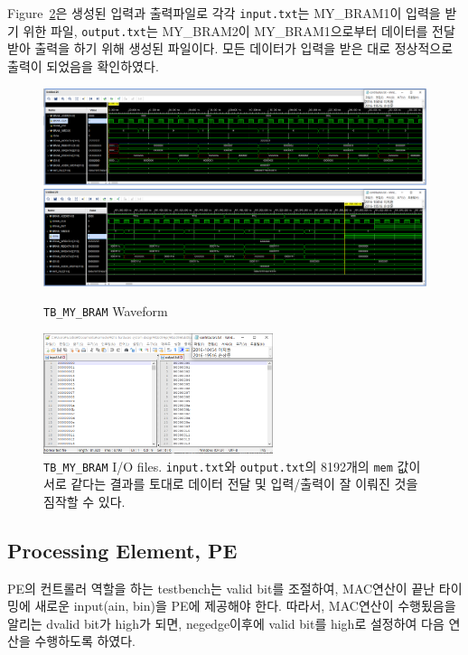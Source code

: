 \documentclass{article}
\begin{document}
Figure~\ref{fig3}은 생성된 입력과 출력파일로 각각 \texttt{input.txt}는 MY\_BRAM1이 입력을 받기 위한 파일, \texttt{output.txt}는 MY\_BRAM2이 MY\_BRAM1으로부터 데이터를 전달받아 출력을 하기 위해 생성된 파일이다. 모든 데이터가 입력을 받은 대로 정상적으로 출력이 되었음을 확인하였다.
\begin{figure}[!htb]
	\centering
	\includegraphics[width=1.0\textwidth]{../../submission/MY_BRAM/MY_BRAM_Waveform1.png}
	\includegraphics[width=1.0\textwidth]{../../submission/MY_BRAM/MY_BRAM_Waveform2.png}
\caption{\texttt{TB\_MY\_BRAM} Waveform}
\label{fig2}
\end{figure}
\begin{figure}[!htb]
	\centering
	\includegraphics[width=0.6\textwidth]{../../submission/MY_BRAM/MY_BRAM_result.png}
\caption{\texttt{TB\_MY\_BRAM} I/O files. \texttt{input.txt}와 \texttt{output.txt}의 8192개의 \texttt{mem} 값이 서로 같다는 결과를 토대로 데이터 전달 및 입력/출력이 잘 이뤄진 것을 짐작할 수 있다.}
\label{fig3}
\end{figure}

\newpage
\subsection{Processing Element, PE}
PE의 컨트롤러 역할을 하는 testbench는 valid bit를 조절하여, MAC연산이 끝난 타이밍에 새로운 input(ain, bin)을 PE에 제공해야 한다. 따라서, MAC연산이 수행됬음을 알리는 dvalid bit가 high가 되면, negedge이후에 valid bit를 high로 설정하여 다음 연산을 수행하도록 하였다. \\
\end{document}
